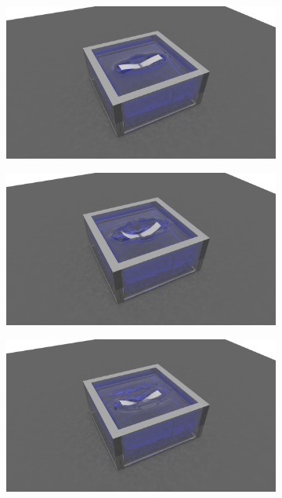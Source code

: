 \begin{figure}[H]
	\centering	

	\begin{subfigure}{0.48\columnwidth}	
		\centering
		\includegraphics[width=1.0\textwidth]{images/Compliant_Robotics/Scene30.png}
	\end{subfigure}	
	\begin{subfigure}{0.48\columnwidth}	
	\centering
	\includegraphics[width=1.0\textwidth]{images/Compliant_Robotics/Scene40.png}
\end{subfigure}	
	\begin{subfigure}{0.48\columnwidth}	
	\centering
	\includegraphics[width=1.0\textwidth]{images/Compliant_Robotics/Scene50.png}

\end{subfigure}
\end{figure}
